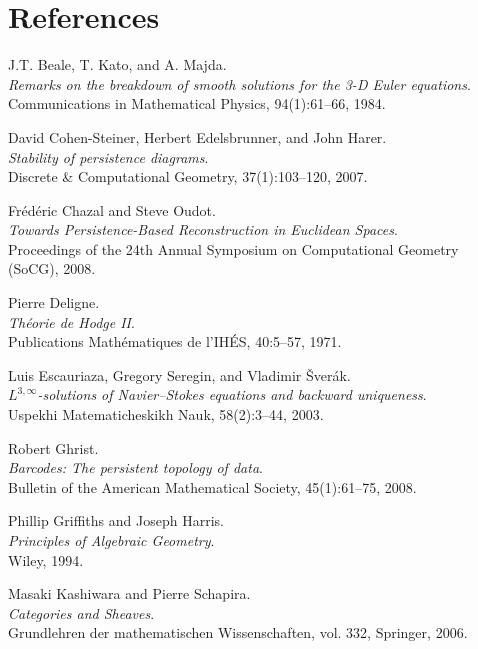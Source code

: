 \documentclass[11pt]{article}
\theoremstyle{definition}
\begin{document}
\section*{References}
\begin{thebibliography}{99}

J.T. Beale, T. Kato, and A. Majda.\\
\textit{Remarks on the breakdown of smooth solutions for the 3-D Euler equations}.\\
Communications in Mathematical Physics, 94(1):61--66, 1984.

David Cohen-Steiner, Herbert Edelsbrunner, and John Harer.\\
\textit{Stability of persistence diagrams}.\\
Discrete \& Computational Geometry, 37(1):103--120, 2007.

Frédéric Chazal and Steve Oudot.\\
\textit{Towards Persistence-Based Reconstruction in Euclidean Spaces}.\\
Proceedings of the 24th Annual Symposium on Computational Geometry (SoCG), 2008.

Pierre Deligne.\\
\textit{Théorie de Hodge II}.\\
Publications Mathématiques de l’IHÉS, 40:5--57, 1971.

Luis Escauriaza, Gregory Seregin, and Vladimir \v{S}ver\'ak.\\
\textit{$L^{3,\infty}$-solutions of Navier–Stokes equations and backward uniqueness}.\\
Uspekhi Matematicheskikh Nauk, 58(2):3--44, 2003.

Robert Ghrist.\\
\textit{Barcodes: The persistent topology of data}.\\
Bulletin of the American Mathematical Society, 45(1):61--75, 2008.

Phillip Griffiths and Joseph Harris.\\
\textit{Principles of Algebraic Geometry}.\\
Wiley, 1994.

Masaki Kashiwara and Pierre Schapira.\\
\textit{Categories and Sheaves}.\\
Grundlehren der mathematischen Wissenschaften, vol. 332, Springer, 2006.


\end{thebibliography}
\end{document}
